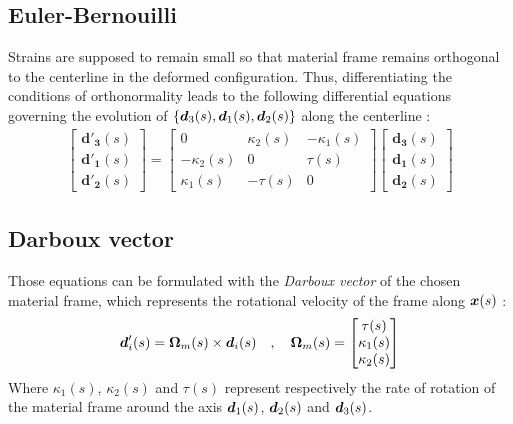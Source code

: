 \subsection{Euler-Bernouilli}
Strains are supposed to remain small so that material frame remains orthogonal to the centerline in the deformed configuration. Thus, differentiating the conditions of orthonormality leads to the following differential equations governing the evolution of $\{\boldsymbol{d}_3 (s),\boldsymbol{d}_1 (s),\boldsymbol{d}_2 (s)\}$ along the centerline :
\begin{gather}
	\begin{bmatrix}
		\mathbf{d'_{3}}(s) \\
		\mathbf{d'_{1}}(s) \\
		\mathbf{d'_{2}}(s)
	\end{bmatrix}
	=
	\begin{bmatrix}
		0 & \kappa_{2}(s) & -\kappa_{1}(s) \\
		-\kappa_{2}(s) & 0 & \tau(s) \\
		\kappa_{1}(s) & -\tau(s) & 0
	\end{bmatrix}
	\begin{bmatrix}
		\mathbf{d_{3}}(s) \\
		\mathbf{d_{1}}(s) \\
		\mathbf{d_{2}}(s)
	\end{bmatrix}
\end{gather}

\subsection{Darboux vector}
Those equations can be formulated with the \emph{Darboux vector} of the chosen material frame, which represents the rotational velocity of the frame along $\boldsymbol{x}(s)$ :
\begin{gather}
	\boldsymbol{d}'_{i}(s) = \boldsymbol{\Omega}_m(s) \times \boldsymbol{d}_i(s)
	\quad,\quad
	\boldsymbol{\Omega}_m(s) 
	= 
	\begin{bmatrix}
		\tau(s) \\
		\kappa_{1}(s) \\
		\kappa_{2}(s)
	\end{bmatrix}
\end{gather}
Where $\kappa_1(s)$, $\kappa_2(s)$ and $\tau(s)$ represent respectively the rate of rotation of the material frame around the axis  $\boldsymbol{d}_1 (s)$, $\boldsymbol{d}_2 (s)$ and $\boldsymbol{d}_3 (s)$.


